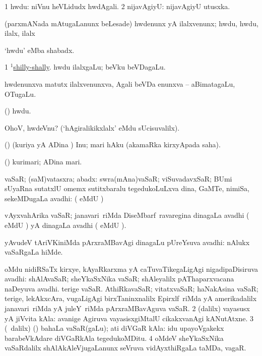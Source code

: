 \bentry
{} 
\gl{\kirxvi} 
\bmng
\bnum
\num{1} hwdu:  niVnu heVLidudx hwdAgali. 
\num{2} nijavAgiyU:   nijavAgiyU  utusxka.
\enum
\emng

\noindent
\gl{\pagu} 
\bmng
{} (parxmANada mAtugaLanunx beLesade) hwdenunx yA ilalxvenunx; hwdu, hwdu, ilalx, ilalx
\emng
\eentry

\bentry
{} 
\gl{\nA} 
\bmng
`hwdu'  eMba shabadx.
\emng

\noindent
\gl{\pagu}
\bmng
\bnum
\num{1}  \hyperref{kandict_s.pdf}{S}{shilly-shally(1)}{$^1$shilly-shally}.
 
\banum
{} hwdu ilalxgaLu; beVku beVDagaLu. 

 hwdenunxva matutx  ilalxvenunxva, Agali beVDa enunxva -- aBimatagaLu, OTugaLu.
\eanum
\numie
\enum
\emng
\eentry

\bentry
{} 
\gl{\kirxvi} 
\bmng
(\AmA) hwdu.
\emng

\noindent
\gl{\pagu}
\bmng
{} OhoV, hwdeVnu? (`hAgiralikikxlalx' eMdu sUcisuvalilx).
\emng
\eentry

\bentry
{} 
\gl{\akirx} 
\bmng
(\pArxparx) 
(kuriya yA ADina \vi) Inu; mari hAku (akamaRka kirxyApada saha).
\emng
\eentry

\bentry
{} 
\gl{\nA} 
\bmng
(\pArxparx)
kurimari; ADina mari.
\emng
\eentry

\bentry
{} 
\gl{\nA}
\bmng
\bnum
{}
vaSaR; (saM)vatasxra; abadx:
\banum
{} swra(mAna)vaSaR; viSuvadavxSaR; BUmi sUyaRna sutatxlU omemx sutitxbaralu  tegedukoLuLxva  dina,  GaMTe,  nimiSa,  sekeMDugaLa avadhi: ( eMdU \parx) 

 vAyxvahArika vaSaR; janavari \,riMda DiseMbarf \,ravaregina  dinagaLa avadhi ( eMdU \parx) yA   dinagaLa avadhi ( eMdU \parx). 

 yAvudeV tAriVKiniMda pArxraMBavAgi  dinagaLu pUreYsuva avadhi:  nAlukx vaSaRgaLa hiMde. 

 oMdu nidiRSaTx kirxye, kAyaRkarxma yA caTuvaTikegaLigAgi nigadipaDisiruva avadhi:  shAlAvaSaR; sheYkaSxNika vaSaR; shAleyalilx pAThaparxvacana naDeyuva avadhi.  terige vaSaR.   AthiRkavaSaR; vitatxvaSaR; haNakAsina vaSaR; terige, lekAkxcAra, \mo vugaLigAgi birxTaninxnalilx Epirxlf \,riMda yA amerikadalilx janavari \,riMda yA juleY \,riMda pArxraMBavAguva vaSaR. 
\eanum
\numie
\num{2} (\bava dalilx) vayasusx yA jiVvita kAla:  avanige Agiruva vayasisxgiMtalU cikakxvanAgi kANutAtxne.   
\num{3} (\sA\ \bava dalilx) (\AmA) bahaLa vaSaR(gaLu); ati diVGaR kAla:    idu upayoVgakekx barabeVkAdare diVGaRkAla tegedukoMDitu.  
\num{4} oMdeV sheYkaSxNika vaSaRdalilx shAlAkAleVjugaLanunx seVruva vidAyxthiRgaLa taMDa, vagaR.
\enum
\emng 

